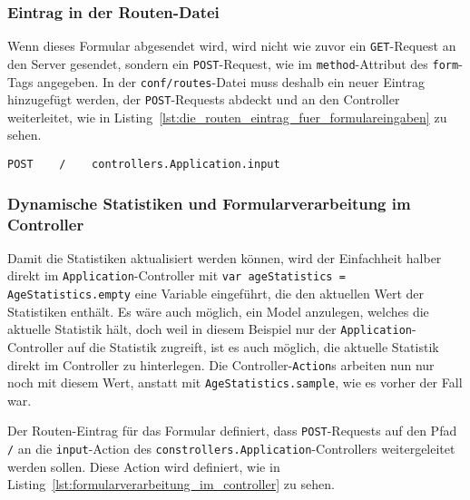 
\subsubsection{Eintrag in der Routen-Datei} %
\label{ssub:eintrag_in_der_routen_datei}

Wenn dieses Formular abgesendet wird, wird nicht wie zuvor ein \lstinline|GET|-Request an den Server gesendet, sondern ein \lstinline|POST|-Request, wie im \lstinline|method|-Attribut des \lstinline|form|-Tags angegeben.
In der \lstinline|conf/routes|-Datei muss deshalb ein neuer Eintrag hinzugefügt werden, der \lstinline|POST|-Requests abdeckt und an den Controller weiterleitet, wie in Listing~\ref{lst:die_routen_eintrag_fuer_formulareingaben} zu sehen.

\begin{lstlisting}[caption=Die Routen-Eintrag für Formulareingaben, label=lst:die_routen_eintrag_fuer_formulareingaben]
POST    /    controllers.Application.input
\end{lstlisting}


\subsubsection{Dynamische Statistiken und Formularverarbeitung im Controller} %
\label{ssub:formularverarbeitung_im_controller}

Damit die Statistiken aktualisiert werden können, wird der Einfachheit halber direkt im \lstinline|Application|-Controller mit \lstinline|var ageStatistics = AgeStatistics.empty| eine Variable eingeführt, die den aktuellen Wert der Statistiken enthält.
Es wäre auch möglich, ein Model anzulegen, welches die aktuelle Statistik hält, doch weil in diesem Beispiel nur der \lstinline|Application|-Controller auf die Statistik zugreift, ist es auch möglich, die aktuelle Statistik direkt im Controller zu hinterlegen.
Die Controller-\lstinline|Action|s arbeiten nun nur noch mit diesem Wert, anstatt mit \lstinline|AgeStatistics.sample|, wie es vorher der Fall war.

Der Routen-Eintrag für das Formular definiert, dass \lstinline|POST|-Requests auf den Pfad \lstinline|/| an die \lstinline|input|-Action des \lstinline|constrollers.Application|-Controllers weitergeleitet werden sollen.
Diese Action wird definiert, wie in Listing~\ref{lst:formularverarbeitung_im_controller} zu sehen.

